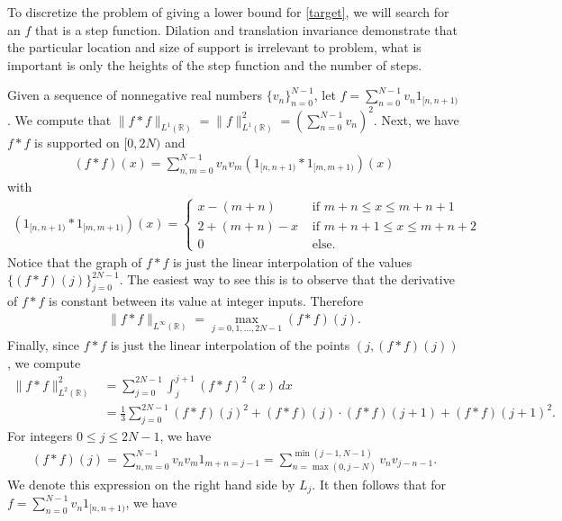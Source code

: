 \documentclass[reqno, 11pt]{amsart}
\newcommand{\R}[0]{\mathbb{R}}
\newcommand{\nms}[1]{\| #1 \|}
\theoremstyle{remark}
\begin{document}
To discretize the problem of giving a lower bound for \eqref{target},
we will search for an $f$ that is a step function.
Dilation and translation invariance demonstrate that
the particular location and size of support is irrelevant
to problem, what is important is only the heights
of the step function and the number of steps.

Given a sequence of nonnegative real numbers $\{v_n\}_{n = 0}^{N-1}$, let $f = \sum_{n = 0}^{N-1}v_{n}1_{[n, n+1)}$. We compute that $\nms{f \ast f}_{L^{1}(\R)} = \nms{f}_{L^{1}(\R)}^{2} = (\sum_{n = 0}^{N-1}v_{n})^{2}$. Next, we have $f \ast f$ is supported
on $[0, 2N)$ and
\begin{align*}
(f \ast f)(x) = \sum_{n, m = 0}^{N-1}v_{n}v_{m}(1_{[n, n+1)} \ast 1_{[m, m+1)})(x)
\end{align*}
with
\begin{align*}
(1_{[n, n+1)} \ast 1_{[m, m+1)})(x) = \begin{cases}
x - (m + n) & \text{ if } m + n \leq x \leq m + n + 1\\
2+ (m + n) - x & \text{ if } m + n + 1 \leq x \leq m + n + 2\\
0 & \text{ else.}
\end{cases}
\end{align*}
Notice that the graph of $f \ast f$ is just the linear
interpolation of the values $\{(f \ast f)(j)\}_{j= 0}^{2N - 1}$. The easiest way to see this is to observe that the derivative
of $f \ast f$ is constant between its value at integer inputs.
Therefore
\begin{align*}
\nms{f \ast f}_{L^{\infty}(\R)} = \max_{j = 0, 1, \ldots, 2N - 1}(f \ast f)(j).
\end{align*}
Finally, since $f \ast f$ is just the linear interpolation
of the points $(j, (f \ast f)(j))$, we compute
\begin{align*}
\nms{f \ast f}_{L^{2}(\R)}^{2} &= \sum_{j = 0}^{2N - 1}\int_{j}^{j + 1}(f \ast f)^{2}(x)\, dx\\
&= \frac{1}{3}\sum_{j = 0}^{2N - 1}(f \ast f)(j)^{2} + (f \ast f)(j) \cdot (f \ast f)(j + 1) + (f \ast f)(j + 1)^{2}.
\end{align*}
For integers $0 \leq j \leq 2N- 1$, we have
\begin{align}\label{ljdef}
(f \ast f)(j) = \sum_{n, m = 0}^{N - 1}v_{n}v_{m}1_{m + n = j - 1}= \sum_{n = \max(0, j - N)}^{\min(j - 1, N - 1)}v_{n}v_{j - n - 1}.
\end{align}
We denote this expression on the right hand side by $L_j$.
It then follows that for $f = \sum_{n = 0}^{N - 1}v_{n}1_{[n, n + 1)}$, we have
\end{document}
